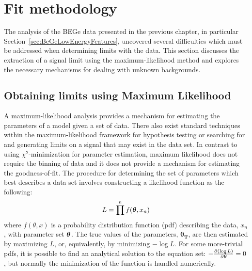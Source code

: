 \section{Fit methodology} 

	The analysis of the BEGe data presented in the previous chapter, in particular Section~\ref{sec:BeGeLowEnergyFeatures}, uncovered several difficulties which must be addressed when determining limits with the data.  This section discusses the extraction of a signal limit using the maximum-likelihood method and explores the necessary mechanisms for dealing with unknown backgrounds.  
	
	\subsection{Obtaining limits using Maximum Likelihood}
	\label{sec:LimitsML}		

A maximum-likelihood analysis provides a mechanism for estimating the parameters of a model given a set of data.  There also exist standard techniques within the maximum-likelihood framework for hypothesis testing or searching for and generating limits on a signal that may exist in the data set.  In contrast to using $\chi^{2}$-minimization for parameter estimation, maximum likelihood does not require the binning of data
 and it does not provide a mechanism for estimating the goodness-of-fit.  The procedure for determining the set of parameters which best describes a data set involves constructing a likelihood function as the following:
		\[
		L = \prod^{n} f({\boldsymbol{\theta}}, x_{n})
		\]
where $f(\theta, x)$ is a probability distribution function (pdf) describing the data, $x_{n}$, with parameter set $\boldsymbol{\theta}$.  The true values of the parameters, $\boldsymbol{\theta_{T}}$, are then estimated by maximizing $L$, or, equivalently, by minimizing $-\log L$.  For some more-trivial pdfs, it is possible to find an analytical solution to the equation set: $-\frac{\partial ( \log L )}{\partial\boldsymbol{\theta}} = 0$, but normally the minimization of the function is handled numerically.  

